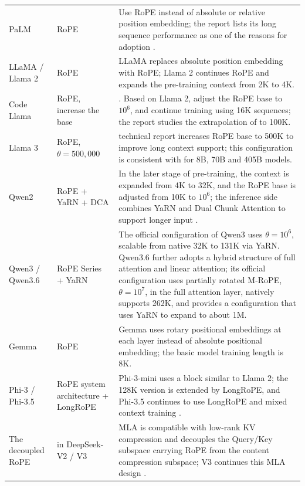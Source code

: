 \documentclass[UTF8,fontset=none,a4paper,10pt]{ctexart}
\begin{document}
\begin{longtable}{@{}p{2.7cm}p{3.6cm}p{8.0cm}@{}}
PaLM & RoPE & Use RoPE instead of absolute or relative position embedding; the report lists its long sequence performance as one of the reasons for adoption \cite{chowdhery2022palm}. \\

LLaMA / Llama 2 & RoPE & LLaMA replaces absolute position embedding with RoPE; Llama 2 continues RoPE and expands the pre-training context from 2K to 4K\cite{touvron2023llama,touvron2023llama2}. \\

Code Llama & RoPE, increase the base &. Based on Llama 2, adjust the RoPE base to $10^6$, and continue training using 16K sequences; the report studies the extrapolation of \cite{roziere2023codellama} to 100K. \\

Llama 3 & RoPE, $\theta=500{,}000$ & technical report increases RoPE base to 500K to improve long context support; this configuration is consistent with \cite{dubey2024llama3} for 8B, 70B and 405B models. \\

Qwen2 & RoPE + YaRN + DCA & In the later stage of pre-training, the context is expanded from 4K to 32K, and the RoPE base is adjusted from 10K to $10^6$; the inference side combines YaRN and Dual Chunk Attention to support longer input \cite{yang2024qwen2}. \\

Qwen3 / Qwen3.6 & RoPE Series + YaRN & The official configuration of Qwen3 uses $\theta=10^6$, scalable from native 32K to 131K\cite{yang2025qwen3} via YaRN. Qwen3.6 further adopts a hybrid structure of full attention and linear attention; its official configuration uses partially rotated M-RoPE, $\theta=10^7$, in the full attention layer, natively supports 262K, and provides a configuration \cite{qwen36config} that uses YaRN to expand to about 1M. \\

Gemma & RoPE & Gemma uses rotary positional embeddings at each layer instead of absolute positional embedding; the basic model training length is 8K\cite{gemmateam2024}. \\

Phi-3 / Phi-3.5 & RoPE system architecture + LongRoPE & Phi-3-mini uses a block similar to Llama 2; the 128K version is extended by LongRoPE, and Phi-3.5 continues to use LongRoPE and mixed context training \cite{abdin2024phi3}. \\

The decoupled RoPE & in DeepSeek-V2 / V3 & MLA is compatible with low-rank KV compression and decouples the Query/Key subspace carrying RoPE from the content compression subspace; V3 continues this MLA design \cite{deepseek2024v2,deepseek2024v3}. \\


\end{longtable}
\end{document}
